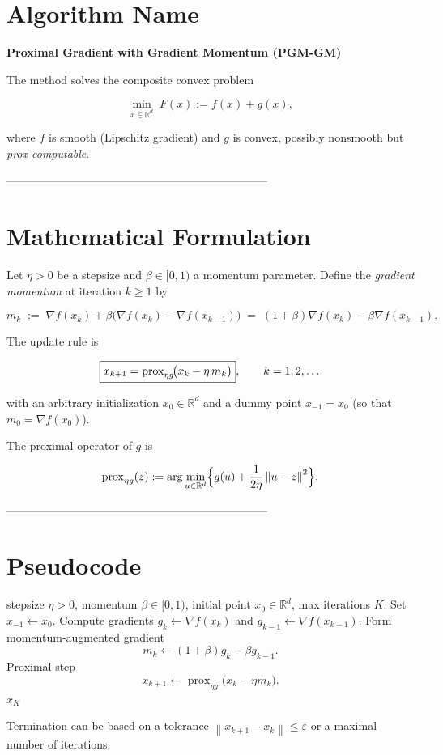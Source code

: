 \documentclass{article}
\newcommand{\prox}{\operatorname{prox}}
\newcommand{\R}{\mathbb{R}}
\newcommand{\norm}[1]{\left\lVert #1\right\rVert}
\newcommand{\grad}{\nabla}
\begin{document}
\section*{Algorithm Name}
\textbf{Proximal Gradient with Gradient Momentum (PGM-GM)}  

The method solves the composite convex problem  

\[
\min_{x\in\R^{d}} \; F(x):=f(x)+g(x),
\]

where $f$ is smooth (Lipschitz gradient) and $g$ is convex, possibly nonsmooth but \emph{prox‑computable}.

---------------------------------------------------------------------

\section*{Mathematical Formulation}
Let $\eta>0$ be a stepsize and $\beta\in[0,1)$ a momentum parameter.  
Define the \emph{gradient momentum} at iteration $k\ge 1$ by  

\[
m_k \;:=\; \grad f(x_k)+\beta\bigl(\grad f(x_k)-\grad f(x_{k-1})\bigr)
        \;=\;(1+\beta)\grad f(x_k)-\beta\grad f(x_{k-1}).
\]

The update rule is  

\[
\boxed{%
x_{k+1}= \prox_{\eta g}\!\bigl(x_k-\eta\,m_k\bigr)},
\qquad k=1,2,\dots
\]

with an arbitrary initialization $x_0\in\R^{d}$ and a dummy point $x_{-1}=x_0$ (so that $m_0=\grad f(x_0)$).

The proximal operator of $g$ is  

\[
\prox_{\eta g}(z):=\arg\min_{u\in\R^{d}}\Bigl\{ g(u)+\frac{1}{2\eta}\norm{u-z}^{2}\Bigr\}.
\]

---------------------------------------------------------------------

\section*{Pseudocode}
\begin{algorithm}[H]
\caption{Proximal Gradient with Gradient Momentum (PGM‑GM)}\label{alg:pgm}
\begin{algorithmic}[1]
\REQUIRE stepsize $\eta>0$, momentum $\beta\in[0,1)$, initial point $x_0\in\R^{d}$, max iterations $K$.
\STATE Set $x_{-1}\leftarrow x_0$.
    \STATE Compute gradients $g_k\leftarrow\grad f(x_k)$ and $g_{k-1}\leftarrow\grad f(x_{k-1})$.
    \STATE Form momentum‑augmented gradient 
          \[
          m_k \leftarrow (1+\beta)g_k-\beta g_{k-1}.
          \]
    \STATE Proximal step  
          \[
          x_{k+1}\leftarrow \prox_{\eta g}\bigl(x_k-\eta m_k\bigr).
          \]
\ENDFOR
\RETURN $x_{K}$
\end{algorithmic}
\end{algorithm}
Termination can be based on a tolerance $\norm{x_{k+1}-x_k}\le\varepsilon$ or a maximal number of iterations.
\end{document}
